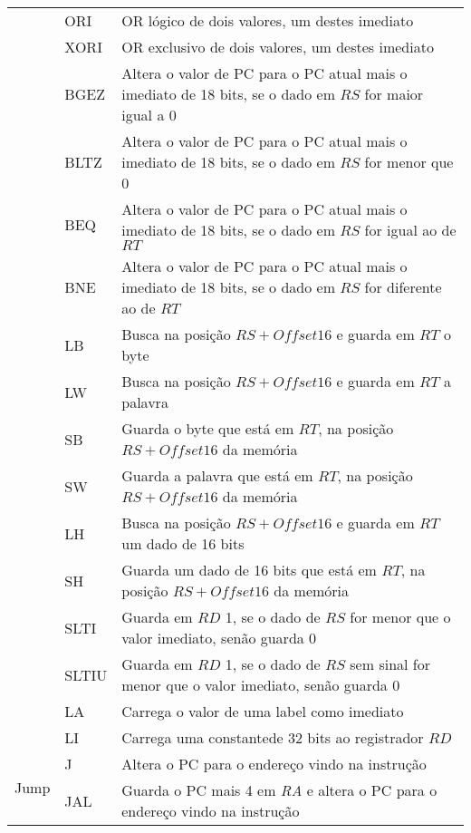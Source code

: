 \begin{center}
\begin{longtable}[pos]{|m{2cm} | m{1cm} | m{8cm}|}
	& ORI & OR lógico de dois valores, um destes imediato \\ \cline{2-3}
	& XORI & OR exclusivo de dois valores, um destes imediato \\ \cline{2-3}
	& BGEZ & Altera o valor de PC para o PC atual mais o imediato de 18 bits, se o dado em $RS$ for maior igual a 0 \\ \cline{2-3}
	& BLTZ & Altera o valor de PC para o PC atual mais o imediato de 18 bits, se o dado em $RS$ for menor que 0 \\ \cline{2-3}
	& BEQ & Altera o valor de PC para o PC atual mais o imediato de 18 bits, se o dado em $RS$ for igual ao de $RT$ \\ \cline{2-3}
	& BNE &  Altera o valor de PC para o PC atual mais o imediato de 18 bits, se o dado em $RS$ for diferente ao de $RT$\\ \cline{2-3}
	& LB & Busca na posição $RS+Offset16$ e guarda em $RT$ o byte \\ \cline{2-3}
	& LW & Busca na posição $RS+Offset16$ e guarda em $RT$ a palavra \\ \cline{2-3}
	& SB & Guarda o byte que está em $RT$, na posição $RS+Offset16$ da memória \\ \cline{2-3}
	& SW & Guarda a palavra que está em $RT$, na posição $RS+Offset16$ da memória \\ \cline{2-3}
	& LH & Busca na posição $RS+Offset16$ e guarda em $RT$ um dado de 16 bits\\ \cline{2-3}
	& SH & Guarda um dado de 16 bits que está em $RT$, na posição $RS+Offset16$ da memória \\ \cline{2-3}
	& SLTI & Guarda em $RD$ 1, se o dado de $RS$ for menor que o valor imediato, senão guarda 0 \\ \cline{2-3}
	& SLTIU & Guarda em $RD$ 1, se o dado de $RS$ sem sinal for menor que o valor imediato, senão guarda 0 \\ \cline{2-3}
	& LA & Carrega o valor de uma label como imediato \\ \cline{2-3}
	& LI & Carrega uma constantede 32 bits ao registrador $RD$ \\\hline
	\multirow{2}{*}{Jump} & J & Altera o PC para o endereço vindo na instrução \\ \cline{2-3}
	& JAL & Guarda o PC mais 4 em \textit{RA} e altera o PC para o endereço vindo na instrução \\\hline
\end{longtable}
\end{center}

